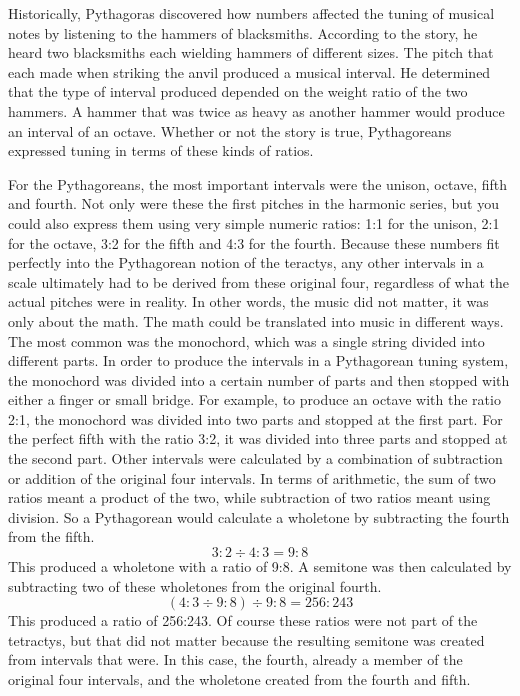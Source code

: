 Historically, Pythagoras discovered how numbers affected the tuning of musical
notes by listening to the hammers of blacksmiths.  According to the story, he
heard two blacksmiths each wielding hammers of different sizes.  The pitch that
each made when striking the anvil produced a musical interval.  He determined
that the type of interval produced depended on the weight ratio of the two
hammers. A hammer that was twice as heavy as another hammer would produce an
interval of an octave.  Whether or not the story is true, Pythagoreans expressed
tuning in terms of these kinds of ratios.

For the Pythagoreans, the most important intervals were the unison, octave,
fifth and fourth.  Not only were these the first pitches in the harmonic series,
but you could also express them using very simple numeric ratios: 1:1 for the
unison, 2:1 for the octave, 3:2 for the fifth and 4:3 for the fourth.  Because
these numbers fit perfectly into the Pythagorean notion of the teractys, any
other intervals in a scale ultimately had to be derived from these original
four, regardless of what the actual pitches were in reality.\autocite[274]{CN:1}
In other words, the music did not matter, it was only about the math.  The math
could be translated into music in different ways. The most common was the
monochord, which was a single string divided into different parts.  In order to
produce the intervals in a Pythagorean tuning system, the monochord was divided
into a certain number of parts and then stopped with either a finger or small
bridge.  For example, to produce an octave with the ratio 2:1, the monochord was
divided into two parts and stopped at the first part. For the perfect fifth with the
ratio 3:2, it was divided into three parts and stopped at the second
part.  Other intervals were calculated by a combination of subtraction or
addition of the original four intervals.  In terms of arithmetic, the sum of two
ratios meant a product of the two, while subtraction of two ratios meant using
division.  So a Pythagorean would calculate a wholetone by subtracting the
fourth from the fifth.
\begin{equation}
3:2 \div 4:3 = 9:8
\end{equation}
This produced a wholetone with a ratio of 9:8. A semitone was then
calculated by subtracting two of these wholetones from the original fourth.
\begin{equation}
    (4:3 \div 9:8) \div 9:8 = 256:243
\end{equation}
This produced a ratio of 256:243. Of course these ratios were not part of the
tetractys, but that did not matter because the resulting semitone was created from intervals
that were.  In this case, the fourth, already a member of the original four
intervals, and the wholetone created from the fourth and fifth.

